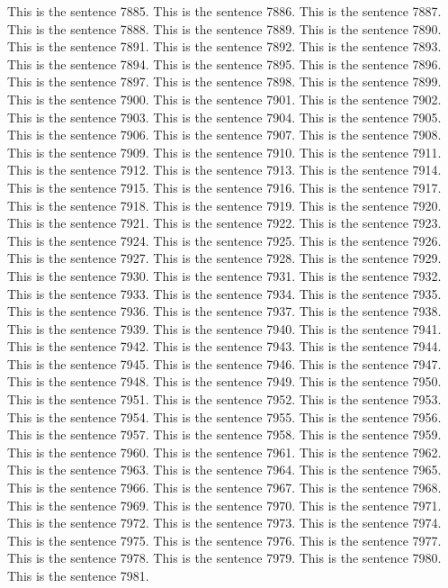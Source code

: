 \documentclass{article}
\begin{document}
This is the sentence 7885.
This is the sentence 7886.
This is the sentence 7887.
This is the sentence 7888.
This is the sentence 7889.
This is the sentence 7890.
This is the sentence 7891.
This is the sentence 7892.
This is the sentence 7893.
This is the sentence 7894.
This is the sentence 7895.
This is the sentence 7896.
This is the sentence 7897.
This is the sentence 7898.
This is the sentence 7899.
This is the sentence 7900.
This is the sentence 7901.
This is the sentence 7902.
This is the sentence 7903.
This is the sentence 7904.
This is the sentence 7905.
This is the sentence 7906.
This is the sentence 7907.
This is the sentence 7908.
This is the sentence 7909.
This is the sentence 7910.
This is the sentence 7911.
This is the sentence 7912.
This is the sentence 7913.
This is the sentence 7914.
This is the sentence 7915.
This is the sentence 7916.
This is the sentence 7917.
This is the sentence 7918.
This is the sentence 7919.
This is the sentence 7920.
This is the sentence 7921.
This is the sentence 7922.
This is the sentence 7923.
This is the sentence 7924.
This is the sentence 7925.
This is the sentence 7926.
This is the sentence 7927.
This is the sentence 7928.
This is the sentence 7929.
This is the sentence 7930.
This is the sentence 7931.
This is the sentence 7932.
This is the sentence 7933.
This is the sentence 7934.
This is the sentence 7935.
This is the sentence 7936.
This is the sentence 7937.
This is the sentence 7938.
This is the sentence 7939.
This is the sentence 7940.
This is the sentence 7941.
This is the sentence 7942.
This is the sentence 7943.
This is the sentence 7944.
This is the sentence 7945.
This is the sentence 7946.
This is the sentence 7947.
This is the sentence 7948.
This is the sentence 7949.
This is the sentence 7950.
This is the sentence 7951.
This is the sentence 7952.
This is the sentence 7953.
This is the sentence 7954.
This is the sentence 7955.
This is the sentence 7956.
This is the sentence 7957.
This is the sentence 7958.
This is the sentence 7959.
This is the sentence 7960.
This is the sentence 7961.
This is the sentence 7962.
This is the sentence 7963.
This is the sentence 7964.
This is the sentence 7965.
This is the sentence 7966.
This is the sentence 7967.
This is the sentence 7968.
This is the sentence 7969.
This is the sentence 7970.
This is the sentence 7971.
This is the sentence 7972.
This is the sentence 7973.
This is the sentence 7974.
This is the sentence 7975.
This is the sentence 7976.
This is the sentence 7977.
This is the sentence 7978.
This is the sentence 7979.
This is the sentence 7980.
This is the sentence 7981.
\end{document}
